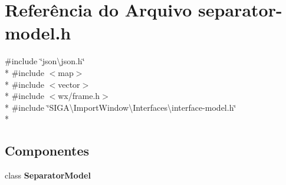 \section{Referência do Arquivo separator-\/model.h}
\label{separator-model_8h}
{\ttfamily \#include \char`\"{}json\textbackslash{}json.\+h\char`\"{}}\\*
{\ttfamily \#include $<$map$>$}\\*
{\ttfamily \#include $<$vector$>$}\\*
{\ttfamily \#include $<$wx/frame.\+h$>$}\\*
{\ttfamily \#include \char`\"{}S\+I\+G\+A\textbackslash{}\+Import\+Window\textbackslash{}\+Interfaces\textbackslash{}interface-\/model.\+h\char`\"{}}\\*
\subsection*{Componentes}
\begin{DoxyCompactItemize}
\item 
class {\bf Separator\+Model}
\end{DoxyCompactItemize}
